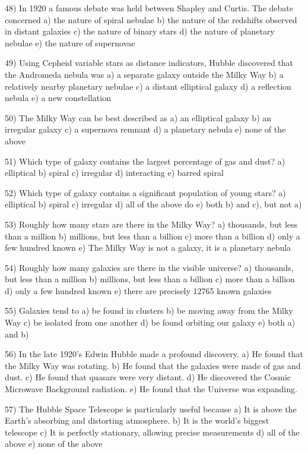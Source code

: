 48) In 1920 a famous debate was held between Shapley and Curtis.
The debate concerned
a) the nature of spiral nebulae
b) the nature of the redshifts observed in distant galaxies
c) the nature of binary stars
d) the nature of planetary nebulae
e) the nature of supernovae

49) Using Cepheid variable stars as distance indicators,
Hubble discovered that the Andromeda nebula was
a) a separate galaxy outside the Milky Way
b) a relatively nearby planetary nebulae
c) a distant elliptical galaxy
d) a reflection nebula
e) a new constellation

50) The Milky Way can be best described as
a) an elliptical galaxy b) an irregular galaxy c) a supernova remnant
d) a planetary nebula e) none of the above

51) Which type of galaxy contains the largest percentage of gas and dust?
a) elliptical b) spiral c) irregular d) interacting e) barred spiral

52) Which type of galaxy contains a significant population of young stars?
a) elliptical b) spiral c) irregular d) all of the above do
e) both b) and c), but not a)

53) Roughly how many stars are there in the Milky Way?
a) thousands, but less than a million
b) millions, but less than a billion
c) more than a billion
d) only a few hundred known
e) The Milky Way is not a galaxy, it is a planetary nebula

54) Roughly how many galaxies are there in the visible universe?
a) thousands, but less than a million
b) millions, but less than a billion
c) more than a billion
d) only a few hundred known
e) there are precisely 12765 known galaxies

55) Galaxies tend to
a) be found in clusters
b) be moving away from the Milky Way
c) be isolated from one another
d) be found orbiting our galaxy
e) both a) and b)

56) In the late 1920's Edwin Hubble made a profound discovery.
a) He found that the Milky Way was rotating.
b) He found that the galaxies were made of gas and dust.
c) He found that quasars were very distant.
d) He discovered the Cosmic Microwave Background radiation.
e) He found that the Universe was expanding.

57) The Hubble Space Telescope is particularly useful because
a) It is above the Earth's absorbing and distorting atmosphere.
b) It is the world's biggest telescope
c) It is perfectly stationary, allowing precise measurements
d) all of the above
e) none of the above

